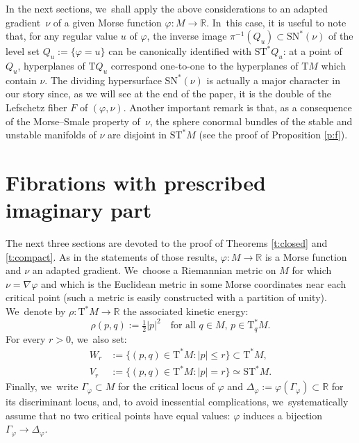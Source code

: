 \documentclass[10pt]{amsart}
\newcommand{\R}{{\mathbb R}}
\newcommand{\Crit}{\Gamma_{\!\varphi}}
\newcommand{\Discr}{\Delta_\varphi}
\newcommand{\sSN}{\mathrm{SN}^\ast}
\newcommand{\sT}{\mathrm{T}^\ast}
\newcommand{\sST}{\mathrm{ST}^\ast}
\newcommand{\rT}{\mathrm{T}}
\newcommand{\de}{\mathrel{:=}}
\newcommand{\with}{\mathrel{:}}
\let\on\colon
\theoremstyle{plain}
\theoremstyle{definition}
\begin{document}
In the next sections, we~shall apply the above considerations to an adapted
gradient~$\nu$ of a given Morse function $\varphi \on M \to \R$. In~this case,
it is useful to note that, for any regular value $u$ of $\varphi$, the inverse
image $\pi^{-1}(Q_u) \subset \sSN(\nu)$ of the level set $Q_u \de \{\varphi=u\}$
can be canonically identified with $\sST Q_u$: at a point of $Q_u$, hyperplanes
of $\rT Q_u$ correspond one-to-one to the hyperplanes of $\rT M$ which contain
$\nu$. The dividing hypersurface $\sSN(\nu)$ is actually a major character in
our story since, as we will see at the end of the paper, it is the double of the
Lefschetz fiber $F$ of $(\varphi,\nu)$. Another important remark is that, as a
consequence of the Morse--Smale property of~$\nu$, the sphere conormal bundles
of the stable and unstable manifolds of $\nu$ are disjoint in $\sST M$ (see the
proof of Proposition \ref{p:f}).

\section{Fibrations with prescribed imaginary part} \label{s:lf-criterion}

The next three sections are devoted to the proof of Theorems \ref{t:closed} and
\ref{t:compact}. As in the statements of those results, $\varphi \on M \to \R$
is a Morse function and $\nu$ an adapted gradient. We~choose a Riemannian metric
on $M$ for which $\nu = \nabla\varphi$ and which is the Euclidean metric in some
Morse coordinates near each critical point (such a metric is easily constructed
with a partition of unity). We~denote by $\rho \on \sT M \to \R$ the associated
kinetic energy:
\[
\rho(p,q) \de \tfrac12 |p|^2 \quad
 \text{for all $q \in M$, $p \in \sT_qM$.}
\]
For every $r>0$, we~also set:
\begin{align*}
	W_r &\de \{(p,q) \in \sT M \with |p| \le r\} \subset \sT M, \\
	V_r &\de \{(p,q) \in \sT M \with |p| = r\} \simeq \sST M.
\end{align*}
Finally, we~write $\Crit \subset M$ for the critical locus of $\varphi$ and
$\Discr \de \varphi(\Crit) \subset \R$ for its discriminant locus, and, to avoid
inessential complications, we~systematically assume that no two critical points
have equal values: $\varphi$ induces a bijection $\Crit \to \Discr$.
\end{document}
